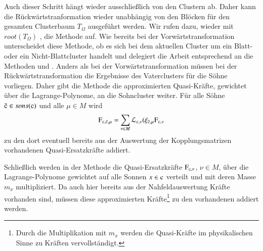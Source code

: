     Auch dieser Schritt hängt wieder ausschließlich von den Clustern ab. Daher kann die Rückwärtstranformation wieder unabhängig von den Blöcken für den gesamten Clusterbaum $T_\Omega$ ausgeführt
    werden. Wir rufen dazu, wieder mit $root(T_\Omega)$ , die Methode  auf. Wie bereits bei der Vorwärtstransformation unterscheidet diese Methode, ob es sich bei
    dem aktuellen Cluster um ein Blatt- oder ein Nicht-Blattcluster handelt und delegiert die Arbeit entsprechend an die Methoden  und 
    . Anders als bei der Vorwärtstransformation müssen bei der Rückwärtstransformation die Ergebnisse des Vaterclusters für die Söhne vorliegen. Daher gibt die
    Methode  die approximierten Quasi-Kräfte, gewichtet über die Lagrange-Polynome, an die Sohncluster weiter. Für alle Söhne $\tilde{\tcode{c}} \in sons(\tcode c)$
    und alle $\mu \in M$ wird
    \[
      \tcode{F}_{\tcode{c},\tilde{\tcode{c}},\mu} = \sum_{\nu \in M} \lag_{\tcode{c},\nu}(\xi_{\tilde{\tcode{c}},\mu} \tcode{F}_{\tcode{c},\nu}
    \]
    zu den dort eventuell bereits aus der Auswertung der Kopplungsmatrizen vorhandenen Quasi-Ersatzkräfte addiert.
    
    Schließlich werden in der Methode  die Quasi-Ersatzkräfte $\tcode{F}_{\tcode{c},\nu}$, $\nu \in M$, über die Lagrange-Polynome gewichtet auf alle Sonnen 
    $x \in \tcode{c}$ verteilt und mit deren Masse $m_x$ multipliziert. Da auch hier bereits aus der Nahfeldauswertung Kräfte vorhanden sind, müssen diese approximierten Kräfte\footnote{Durch die
    Multiplikation mit $m_x$ werden die Quasi-Kräfte im physikalischen Sinne zu Kräften vervollständigt.} zu den vorhandenen addiert werden.
    

  \clearpage